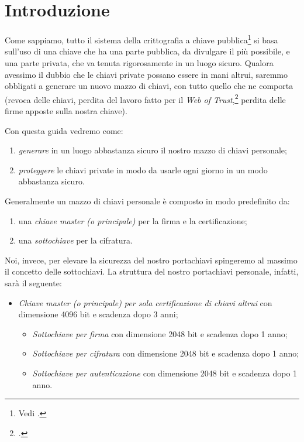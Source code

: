 \section*{Introduzione}

Come sappiamo, tutto il sistema della crittografia a chiave
pubblica\footnote{Vedi \cite{wiki:crittografia}.} si basa sull'uso di una chiave
che ha una parte pubblica, da divulgare il più possibile, e una parte privata,
che va tenuta rigorosamente in un luogo sicuro. Qualora avessimo il dubbio che
le chiavi private possano essere in mani altrui, saremmo obbligati a generare un
nuovo mazzo di chiavi, con tutto quello che ne comporta (revoca delle chiavi,
perdita del lavoro fatto per il \emph{Web of
Trust},\footnote{\cite{wiki:webtrust}.} perdita delle firme apposte sulla nostra
chiave).

Con questa guida vedremo come:

\begin{enumerate}
  \item \emph{generare} in un luogo abbastanza sicuro il nostro mazzo di chiavi
  personale;
  \item \emph{proteggere} le chiavi private in modo da usarle ogni giorno in un
 modo abbastanza sicuro.
\end{enumerate}

Generalmente un mazzo di chiavi personale è composto in modo
predefinito da:

\begin{enumerate}
  \item una \emph{chiave master (o principale)} per la firma e la
  certificazione;
  \item una \emph{sottochiave} per la cifratura.
\end{enumerate}

Noi, invece, per elevare la sicurezza del nostro portachiavi
spingeremo al massimo il concetto delle sottochiavi. La struttura del nostro
portachiavi personale, infatti, sarà il seguente:

\begin{itemize}
  \item \emph{Chiave master (o principale) per sola certificazione di chiavi
  altrui} con dimensione 4096 bit e scadenza dopo 3 anni;
  \begin{itemize}
    \item \emph{Sottochiave per firma} con dimensione 2048 bit e scadenza dopo 1
    anno;
    \item \emph{Sottochiave per cifratura} con dimensione 2048 bit e scadenza
    dopo 1 anno;
    \item \emph{Sottochiave per autenticazione} con dimensione 2048 bit e
    scadenza dopo 1 anno.
  \end{itemize}
\end{itemize}

